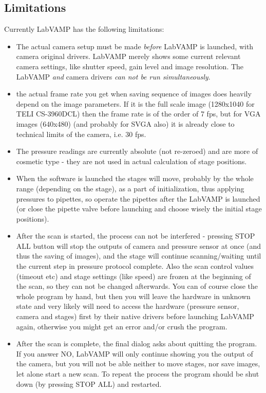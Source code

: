 \subsection{Limitations}\label{labvamp-limits}
Currently LabVAMP has the following limitations:
\begin{itemize}
	\item The actual camera setup must be made \emph{before} LabVAMP is launched, with camera original drivers. LabVAMP merely shows some current relevant camera settings, like shutter speed, gain level and image resolution. The LabVAMP \emph{and} camera drivers \emph{can not be run simultaneously}.
	\item the actual frame rate you get when saving sequence of images does heavily depend on the image parameters. If it is the full scale image (1280x1040 for TELI CS-3960DCL) then the frame rate is of the order of 7 fps, but for VGA images (640x480) (and probably for SVGA also) it is already close to technical limits of the camera, i.e. 30 fps.
	\item The pressure readings are currently absolute (not re-zeroed) and are more of cosmetic type - they are not used in actual calculation of stage positions.
	\item When the software is launched the stages will move, probably by the whole range (depending on the stage), as a part of initialization, thus applying pressures to pipettes, so operate the pipettes after the LabVAMP is launched (or close the pipette valve before launching and choose wisely the initial stage positions).
	\item After the scan is started, the process can not be interfered - pressing STOP ALL button will  stop the outputs of camera and pressure sensor at once (and thus the saving of images), and the stage will continue scanning/waiting until the current step in pressure protocol complete. Also the scan control values (timeout etc) and stage settings (like speed) are frozen at the beginning of the scan, so they can not be changed afterwards. You can of course close the whole program by hand, but then you will leave the hardware in unknown state and very likely will need to access the hardware (pressure sensor, camera and stages) first by their native drivers before launching LabVAMP again, otherwise you might get an error and/or crush the program.
	\item After the scan is complete, the final dialog asks about quitting the program. If you answer NO, LabVAMP will only continue showing you the output of the camera, but you will not be able neither to move stages, nor save images, let alone start a new scan. To repeat the process the program should be shut down (by pressing STOP ALL) and restarted.
\end{itemize}

